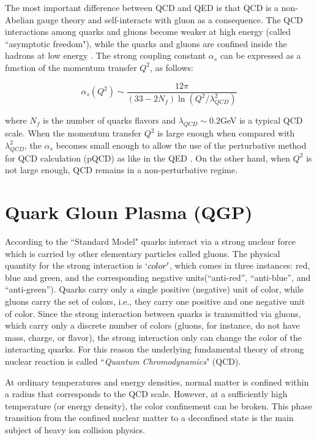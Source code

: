 The most important difference between QCD and QED is that QCD is a non-Abelian gauge theory and self-interacts with gluon as a consequence. The QCD interactions among quarks and gluons become weaker at high energy (called ``asymptotic freedom"), while the quarks and gluons are confined inside the hadrons at  low energy \cite{PhysRevLett.30.1346,PhysRevLett.30.1343}. The strong coupling constant $\alpha_s$ can be expressed as a function of the momentum transfer $Q^2$, as follows:

\begin{equation}
	\alpha_s(Q^2) \sim \frac{12\pi}{(33-2N_f)\ln(Q^2/\lambda^2_{QCD})}
\end{equation}
\bigskip

	where $N_f$ is the number of quarks flavors and $\lambda_{QCD} \sim 0.2$GeV is a typical QCD scale. When the momentum transfer $Q^2$ is large enough when compared with  $\lambda^2_{QCD}$, the $\alpha_s$ becomes small enough to allow the use of the perturbative method for QCD calculation (pQCD) as like in the QED \cite{PhysRevD.10.2445}. On the other hand, when $Q^2$ is not large enough, QCD remains in a  non-perturbative regime. 
	
		
	
\section {Quark Gloun Plasma (QGP)}

According to the ``Standard Model" quarks interact via a strong nuclear force which is carried by other elementary particles called gluons. The physical quantity for the strong interaction is $`color'$, which comes in three instances: red, blue and green, and the corresponding negative units(``anti-red'', ``anti-blue'', and ``anti-green''). Quarks carry only a single positive (negative) unit of color, while gluons carry the set of colors, i.e., they carry one positive and one negative unit of color. Since the strong interaction between quarks is transmitted via gluons, which carry only a discrete number of colors (gluons, for instance, do not have mass, charge, or flavor), the strong interaction only can change the color of the interacting quarks. For this reason the underlying fundamental theory of strong nuclear reaction is called ``\textit{Quantum Chromodynamics}" (QCD).

At ordinary temperatures and energy densities, normal matter is confined within a radius that corresponds to the QCD scale. However, at a sufficiently high temperature (or energy density), the color confinement can be broken. This phase transition from the confined nuclear matter to a deconfined state is the main subject of heavy ion collision physics. 

